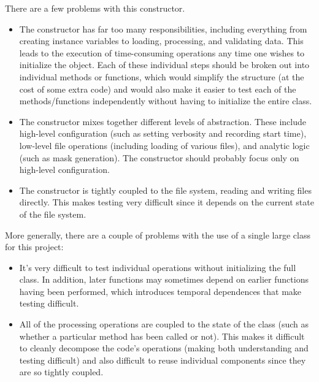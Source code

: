 There are a few problems with this constructor.

\begin{itemize}
\item The constructor has far too many responsibilities, including everything from creating instance variables to loading, processing, and validating data.  This leads to the execution of time-consuming operations any time one wishes to initialize the object.  Each of these individual steps should be broken out into individual methods or functions, which would simplify the structure (at the cost of some extra code) and would also make it easier to test each of the methods/functions independently without having to initialize the entire class.
\item The constructor mixes together different levels of abstraction.  These include high-level configuration (such as setting verbosity and recording start time), low-level file operations (including loading of various files), and analytic logic (such as mask generation).  The constructor should probably focus only on high-level configuration.
\item The constructor is tightly coupled to the file system, reading and writing files directly.  This makes testing very difficult since it depends on the current state of the file system.
\end{itemize}

More generally, there are a couple of problems with the use of a single large class for this project:

\begin{itemize}
\item It's very difficult to test individual operations without initializing the full class.  In addition, later functions may sometimes depend on earlier functions having been performed, which introduces temporal dependences that make testing difficult.
\item All of the processing operations are coupled to the state of the class (such as whether a particular method has been called or not).  This makes it difficult to cleanly decompose the code's operations (making both understanding and testing difficult) and also difficult to reuse individual components since they are so tightly coupled.
\end{itemize}

